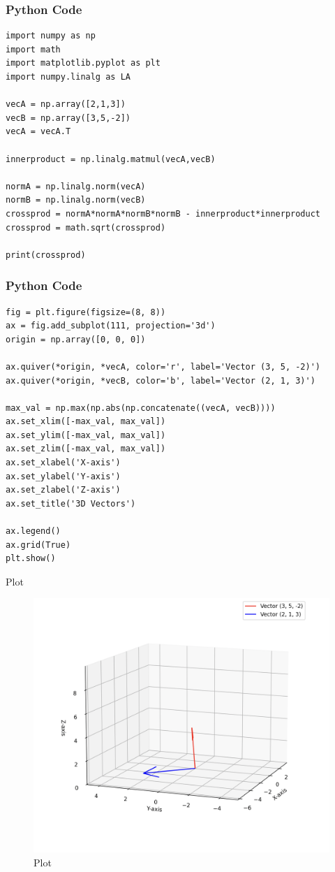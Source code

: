 \documentclass{beamer}
\begin{document}
\begin{frame}[fragile]
    \frametitle{Python Code}
    \begin{lstlisting}
import numpy as np
import math
import matplotlib.pyplot as plt
import numpy.linalg as LA

vecA = np.array([2,1,3])
vecB = np.array([3,5,-2])
vecA = vecA.T

innerproduct = np.linalg.matmul(vecA,vecB)

normA = np.linalg.norm(vecA)
normB = np.linalg.norm(vecB)
crossprod = normA*normA*normB*normB - innerproduct*innerproduct
crossprod = math.sqrt(crossprod)

print(crossprod)

\end{lstlisting}
\end{frame}

\begin{frame}[fragile]
    \frametitle{Python Code}

    \begin{lstlisting}
fig = plt.figure(figsize=(8, 8))
ax = fig.add_subplot(111, projection='3d')
origin = np.array([0, 0, 0])

ax.quiver(*origin, *vecA, color='r', label='Vector (3, 5, -2)')
ax.quiver(*origin, *vecB, color='b', label='Vector (2, 1, 3)')

max_val = np.max(np.abs(np.concatenate((vecA, vecB))))
ax.set_xlim([-max_val, max_val])
ax.set_ylim([-max_val, max_val])
ax.set_zlim([-max_val, max_val])
ax.set_xlabel('X-axis')
ax.set_ylabel('Y-axis')
ax.set_zlabel('Z-axis')
ax.set_title('3D Vectors')

ax.legend()
ax.grid(True)
plt.show()
    \end{lstlisting}
\end{frame}


\begin{frame}{Plot}
\begin{figure}
    \centering
    \includegraphics[width=0.8\columnwidth]{Figs/Figure_4.png}
    \caption{Plot}
    \label{fig:placeholder}
\end{figure}
\end{frame}
\end{document}
